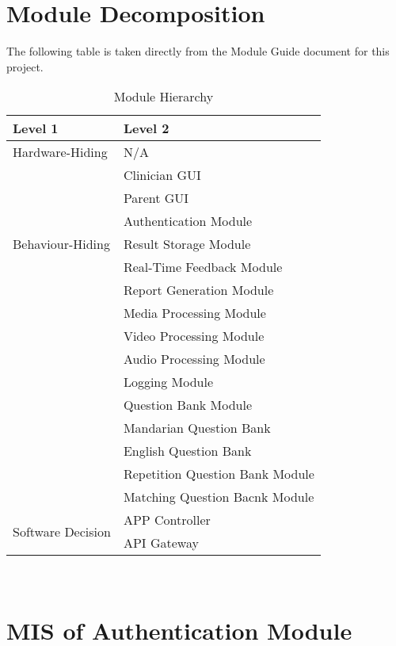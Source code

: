 \documentclass[12pt, titlepage]{article}
\begin{document}
\section{Module Decomposition}

The following table is taken directly from the Module Guide document for this project.

\begin{table}[h!]
\centering
\begin{tabular}{p{} p{}}
\toprule
\textbf{Level 1} & \textbf{Level 2}\\
\midrule

{Hardware-Hiding} & N/A \\
\midrule

\multirow{7}{0.3\textwidth}{Behaviour-Hiding} & Clinician GUI\\
& Parent GUI\\
& Authentication Module\\
& Result Storage Module\\
& Real-Time Feedback Module\\ 
& Report Generation Module\\
& Media Processing Module\\
& Video Processing Module\\
& Audio Processing Module\\
& Logging Module\\
& Question Bank Module\\
& Mandarian Question Bank\\
& English Question Bank\\
& Repetition Question Bank Module\\
& Matching Question Bacnk Module\\
\midrule

\multirow{3}{0.3\textwidth}{Software Decision} & {APP Controller}\\
& API Gateway\\
\bottomrule

\end{tabular}
\caption{Module Hierarchy}
\label{TblMH}
\end{table}

\newpage
~\newpage

\section{MIS of Authentication Module} \label{AuthenticationModule}
\end{document}
